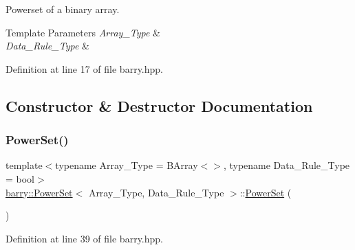 Powerset of a binary array. 


\begin{DoxyTemplParams}{Template Parameters}
{\em Array\+\_\+\+Type} & \\
\hline
{\em Data\+\_\+\+Rule\+\_\+\+Type} & \\
\hline
\end{DoxyTemplParams}


Definition at line 17 of file barry.\+hpp.



\subsection{Constructor \& Destructor Documentation}
\mbox{\label{classbarry_1_1_power_set_ab2fa4e40323bb9225225bb52b86ff345}} 
\subsubsection{\texorpdfstring{Power\+Set()}{PowerSet()}\hspace{0.1cm}{\footnotesize\ttfamily [1/3]}}
{\footnotesize\ttfamily template$<$typename Array\+\_\+\+Type  = B\+Array$<$$>$, typename Data\+\_\+\+Rule\+\_\+\+Type  = bool$>$ \\
\hyperlink{classbarry_1_1_power_set}{barry\+::\+Power\+Set}$<$ Array\+\_\+\+Type, Data\+\_\+\+Rule\+\_\+\+Type $>$\+::\hyperlink{classbarry_1_1_power_set}{Power\+Set} (\begin{DoxyParamCaption}{ }\end{DoxyParamCaption})\hspace{0.3cm}{\ttfamily [inline]}}



Definition at line 39 of file barry.\+hpp.

\mbox{\label{classbarry_1_1_power_set_a96a31964644ea81991fe103a2a8bfb1f}} 
